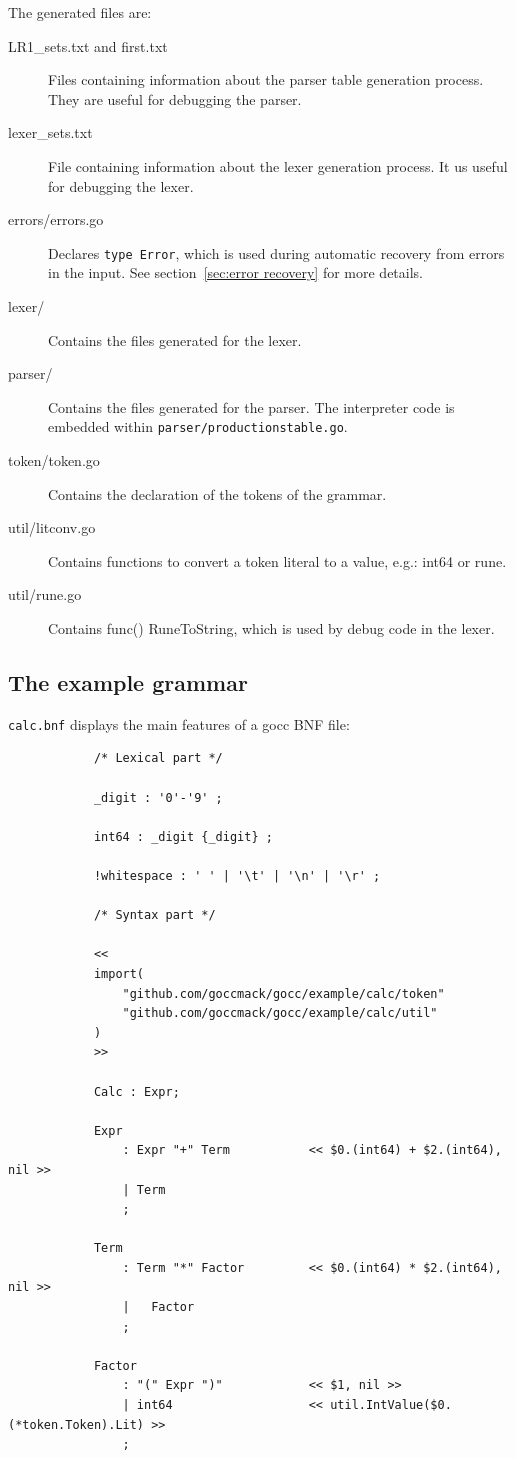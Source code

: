 \documentclass[12pt]{article}
\begin{document}
		The generated files are:
		\begin{description}
			\item[LR1\_sets.txt and first.txt] Files containing information about the parser table generation process. They are useful for debugging the parser.

			\item[lexer\_sets.txt] File containing information about the lexer generation process. It us useful for debugging the lexer.

			\item[errors/errors.go] Declares \verb|type Error|, which is used during automatic recovery from errors in the input. See section~\ref{sec:error recovery} for more details.

			\item[lexer/] Contains the files generated for the lexer.

			\item[parser/] Contains the files generated for the parser. The interpreter code is embedded within \verb|parser/productionstable.go|.

			\item[token/token.go] Contains the declaration of the tokens of the grammar.

			\item[util/litconv.go] Contains functions to convert a token literal to a value, e.g.: int64 or rune.

			\item[util/rune.go] Contains func() RuneToString, which is used by debug code in the lexer.
		\end{description}

	\subsection{The example grammar}
		\verb|calc.bnf| displays the main features of a gocc BNF file:

		\begin{verbatim}
			/* Lexical part */

			_digit : '0'-'9' ;

			int64 : _digit {_digit} ;

			!whitespace : ' ' | '\t' | '\n' | '\r' ;

			/* Syntax part */

			<<
			import(
			    "github.com/goccmack/gocc/example/calc/token"
			    "github.com/goccmack/gocc/example/calc/util"
			)
			>>

			Calc : Expr;

			Expr
			    : Expr "+" Term           << $0.(int64) + $2.(int64), nil >>
			    | Term
			    ;

			Term
			    : Term "*" Factor         << $0.(int64) * $2.(int64), nil >>
			    |	Factor
			    ;

			Factor
			    : "(" Expr ")"            << $1, nil >>
			    | int64                   << util.IntValue($0.(*token.Token).Lit) >>
			    ;

		\end{verbatim}
\end{document}
